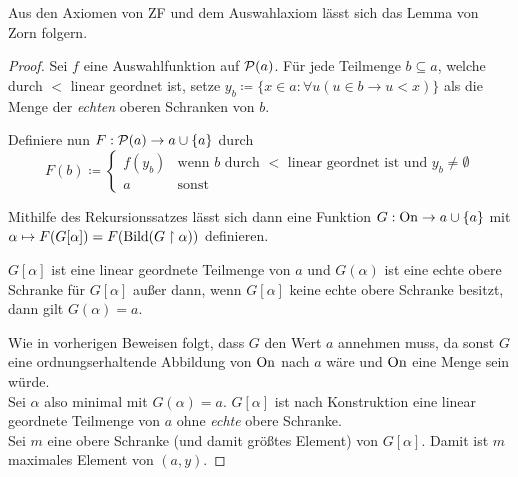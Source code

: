 \begin{satz}
	Aus den Axiomen von ZF und dem Auswahlaxiom lässt sich das Lemma von Zorn folgern.
\end{satz}
\begin{proof}
	Sei $f$ eine Auswahlfunktion auf $\mathcal{P}(a)$. Für jede Teilmenge $b\subseteq a$, welche durch $<$ linear geordnet ist, setze $y_b\coloneqq\{x\in a:\forall u(u\in b\rightarrow u<x)\}$ als die Menge der \textit{echten} oberen Schranken von $b$.
	
	Definiere nun $F:\mathcal{P}(a)\to a\cup\{a\}$ durch
	$$
	F(b)\coloneqq\begin{cases}
		f(y_b) & \text{wenn } b \text{ durch } < \text{ linear geordnet ist und } y_b\neq\emptyset \\
		a & \text{sonst}
	\end{cases}
	$$
	
	Mithilfe des Rekursionssatzes lässt sich dann eine Funktion $G: \operatorname{On}\to a\cup\{a\}$ mit $\alpha\mapsto F(G[\alpha])=F(\operatorname{Bild}(G\upharpoonright\alpha))$ definieren.
	
	$G[\alpha]$ ist eine linear geordnete Teilmenge von $a$ und $G(\alpha)$ ist eine echte obere Schranke für $G[\alpha]$ außer dann, wenn $G[\alpha]$ keine echte obere Schranke besitzt, dann gilt $G(\alpha)=a$.
	
	Wie in vorherigen Beweisen folgt, dass $G$ den Wert $a$ annehmen muss, da sonst $G$ eine ordnungserhaltende Abbildung von $\operatorname{On}$ nach $a$ wäre und $\operatorname{On}$ eine Menge sein würde.
	\\
	Sei $\alpha$ also minimal mit $G(\alpha)=a$. $G[\alpha]$ ist nach Konstruktion eine linear geordnete Teilmenge von $a$ ohne \textit{echte} obere Schranke.
	\\
	Sei $m$ eine obere Schranke (und damit größtes Element) von $G[\alpha]$. Damit ist $m$ maximales Element von $(a,y)$.
\end{proof}

